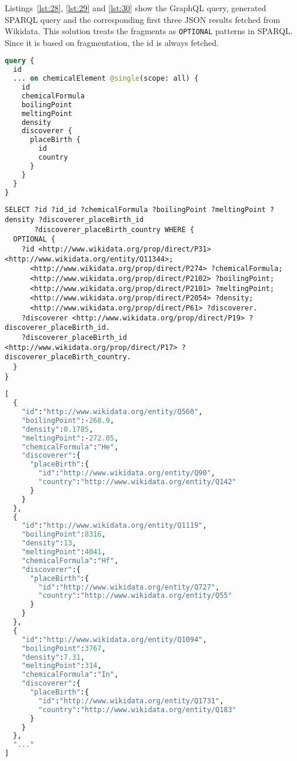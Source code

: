 Listings~\ref{lst:28}, \ref{lst:29} and \ref{lst:30} show the GraphQL query, generated SPARQL query and the corresponding first three JSON results fetched from Wikidata. This solution treats the fragments as \texttt{OPTIONAL} patterns in SPARQL. Since it is based on fragmentation, the id is always fetched.

\begin{minipage}{\linewidth}
\begin{lstlisting}[label=lst:28, caption={GraphQL Query using Solution 3}, language=GraphQL]
query {
  id
  ... on chemicalElement @single(scope: all) {
    id
    chemicalFormula
    boilingPoint
    meltingPoint
    density
    discoverer {
      placeBirth {
        id
        country
      }
    }
  }
}
\end{lstlisting}
\end{minipage}

\begin{minipage}{\linewidth}
\begin{lstlisting}[columns=fullflexible, label=lst:29, caption={Generated SPARQL Query}, language=SPARQL]
SELECT ?id ?id_id ?chemicalFormula ?boilingPoint ?meltingPoint ?density ?discoverer_placeBirth_id
       ?discoverer_placeBirth_country WHERE {
  OPTIONAL {
    ?id <http://www.wikidata.org/prop/direct/P31> <http://www.wikidata.org/entity/Q11344>;
      <http://www.wikidata.org/prop/direct/P274> ?chemicalFormula;
      <http://www.wikidata.org/prop/direct/P2102> ?boilingPoint;
      <http://www.wikidata.org/prop/direct/P2101> ?meltingPoint;
      <http://www.wikidata.org/prop/direct/P2054> ?density;
      <http://www.wikidata.org/prop/direct/P61> ?discoverer.
    ?discoverer <http://www.wikidata.org/prop/direct/P19> ?discoverer_placeBirth_id.
    ?discoverer_placeBirth_id <http://www.wikidata.org/prop/direct/P17> ?discoverer_placeBirth_country.
  }
}
\end{lstlisting}
\end{minipage}

\begin{minipage}{\linewidth}
\begin{lstlisting}[label=lst:30, caption={Results obtained}, language=GraphQL]
[
  {
    "id":"http://www.wikidata.org/entity/Q560",
    "boilingPoint":-268.9,
    "density":0.1785,
    "meltingPoint":-272.05,
    "chemicalFormula":"He",
    "discoverer":{
      "placeBirth":{
        "id":"http://www.wikidata.org/entity/Q90",
        "country":"http://www.wikidata.org/entity/Q142"
      }
    }
  },
  {
    "id":"http://www.wikidata.org/entity/Q1119",
    "boilingPoint":8316,
    "density":13,
    "meltingPoint":4041,
    "chemicalFormula":"Hf",
    "discoverer":{
      "placeBirth":{
        "id":"http://www.wikidata.org/entity/Q727",
        "country":"http://www.wikidata.org/entity/Q55"
      }
    }
  },
  {
    "id":"http://www.wikidata.org/entity/Q1094",
    "boilingPoint":3767,
    "density":7.31,
    "meltingPoint":314,
    "chemicalFormula":"In",
    "discoverer":{
      "placeBirth":{
        "id":"http://www.wikidata.org/entity/Q1731",
        "country":"http://www.wikidata.org/entity/Q183"
      }
    }
  },
  "..."
]
\end{lstlisting}
\end{minipage}

